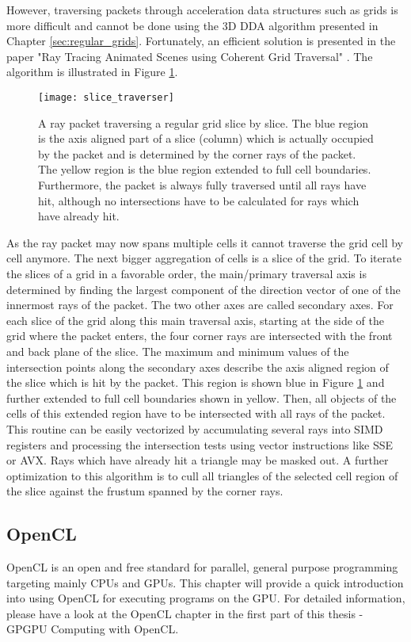 However, traversing packets through acceleration data structures such as grids is more difficult and cannot be done using the 3D DDA algorithm presented in Chapter \ref{sec:regular_grids}. Fortunately, an efficient solution is presented in the paper "Ray Tracing Animated Scenes using Coherent Grid Traversal" \cite{packet_caster}. The algorithm is illustrated in Figure \ref{fig:slice_traverser}.

\begin{figure}
\centering
\texttt{[image: slice\_traverser]}
\caption{A ray packet traversing a regular grid slice by slice. The blue region is the axis aligned part of a slice (column) which is actually occupied by the packet and is determined by the corner rays of the packet. The yellow region is the blue region extended to full cell boundaries. Furthermore, the packet is always fully traversed until all rays have hit, although no intersections have to be calculated for rays which have already hit.}
\label{fig:slice_traverser} 
\end{figure}

As the ray packet may now spans multiple cells it cannot traverse the grid cell by cell anymore. The next bigger aggregation of cells is a slice of the grid. To iterate the slices of a grid in a favorable order, the main/primary traversal axis is determined by finding the largest component of the direction vector of one of the innermost rays of the packet. The two other axes are called secondary axes. For each slice of the grid along this main traversal axis, starting at the side of the grid where the packet enters, the four corner rays are intersected with the front and back plane of the slice. The maximum and minimum values of the intersection points along the secondary axes describe the axis aligned region of the slice which is hit by the packet. This region is shown blue in Figure \ref{fig:slice_traverser} and further extended to full cell boundaries shown in yellow. Then, all objects of the cells of this extended region have to be intersected with all rays of the packet. This routine can be easily vectorized by accumulating several rays into SIMD registers and processing the intersection tests using vector instructions like SSE or AVX. Rays which have already hit a triangle may be masked out. A further optimization to this algorithm is to cull all triangles of the selected cell region of the slice against the frustum spanned by the corner rays.


\subsection{OpenCL}
OpenCL is an open and free standard for parallel, general purpose programming targeting mainly CPUs and GPUs. This chapter will provide a quick introduction into using OpenCL for executing programs on the GPU. For detailed information, please have a look at the OpenCL chapter in the first part of this thesis - GPGPU Computing with OpenCL.

